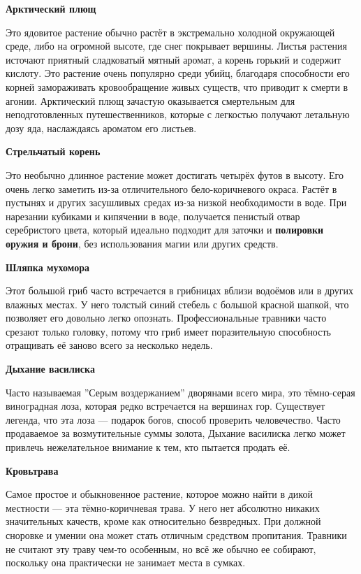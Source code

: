 \documentclass[a4paper, 9pt, twocolumn]{book}
\newcommand{\partc}[2][]{{
		\bigskip
		\noindent
		\hspace{-0.25cm}
		\fontsize{11pt}{13.2}
		\color{sectioncolor}
		\textbf{#2}}
	
	{
		\ifx\relax#1\relax
		\else
		\noindent
		\normalcolor
		\textbf{#1}}
	\bigskip
	\fi
}
\begin{document}
	\partc{Арктический плющ}
	
	\noindent  Это ядовитое растение обычно растёт в экстремально холодной окружающей среде, либо на огромной высоте, где снег покрывает вершины. Листья растения источают приятный сладковатый мятный аромат, а корень горький и содержит кислоту. Это растение очень популярно среди убийц, благодаря способности его корней замораживать кровообращение живых существ, что приводит к смерти в агонии. Арктический плющ зачастую оказывается смертельным для неподготовленных путешественников, которые с легкостью получают летальную дозу яда, наслаждаясь ароматом его листьев.
	
	\partc{Стрельчатый корень}
	
	\noindent Это необычно длинное растение может достигать четырёх футов в высоту. Его очень легко заметить из-за отличительного бело-коричневого окраса. Растёт в пустынях и других засушливых средах из-за низкой необходимости в воде. При нарезании кубиками и кипячении в воде, получается пенистый отвар серебристого цвета, который идеально подходит для заточки и \textbf{полировки оружия и брони}, без использования магии или других средств.
	
	\partc{Шляпка мухомора}
	
	\noindent Этот большой гриб часто встречается в грибницах вблизи водоёмов или в других влажных местах. У него толстый синий стебель с большой красной шапкой, что позволяет его довольно легко опознать. Профессиональные травники часто срезают только головку, потому что гриб имеет поразительную способность отращивать её заново всего за несколько недель.
	
	\partc{Дыхание василиска}
	
	\noindent Часто называемая ''Серым воздержанием'' дворянами всего мира, это тёмно-серая виноградная лоза, которая редко встречается на вершинах гор. Существует легенда, что эта лоза --- подарок богов, способ проверить человечество. Часто продаваемое за возмутительные суммы золота, Дыхание василиска легко может привлечь нежелательное внимание к тем, кто пытается продать её.
	
	\partc{Кровьтрава}
	
	\noindent Самое простое и обыкновенное растение, которое можно найти в дикой местности --- эта тёмно-коричневая трава. У него нет абсолютно никаких значительных качеств, кроме как относительно безвредных. При должной сноровке и умении она может стать отличным средством пропитания. Травники не считают эту траву чем-то особенным, но всё же обычно ее собирают, поскольку она практически не занимает места в сумках.
	
\end{document}
